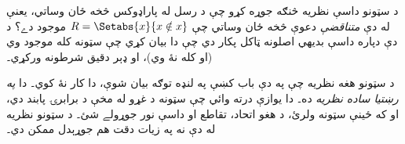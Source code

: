 \documentclass[../../../include/open-logic-section]{subfiles}
\begin{document}
\begin{digress}
د سټونو داسې نظريه څنګه جوړه کړو چې د رسل له پاراډوکس څخه ځان وساتي، يعنې له دې \emph{متناقضې} دعوې څخه ځان وساتي چې $R = \Setabs{x}{x \notin x}$ موجود دے؟ د دې دپاره داسې بديهي اصلونه ټاکل پکار دي چې دا بيان کړي چې سټونه کله موجود وي (او کله نۀ وي)، او ډېر دقيق شرطونه ورکړي۔

د سټونو هغه نظريه چې په دې باب کښې په لنډه توګه بيان شوې، دا کار نۀ کوي۔ دا \emph{په رښتيا ساده نظريه} ده۔ دا يوازې درته وائي چې سټونه د غړو له مخې د برابرۍ پابند دي، او که ځينې سټونه ولرئ، د هغو اتحاد، تقاطع او داسې نور جوړولے شئ۔ د سټونو نظريه له دې نه په زيات دقت هم جوړېدل ممکن دي۔ 
\end{digress}
\end{document}
